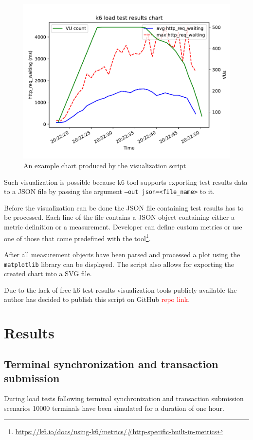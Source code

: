 \documentclass[12pt, a4paper]{article}
\newcommand\todo[1]{\textcolor{red}{#1}}
\let\oldsection\section
\renewcommand\section{\clearpage\oldsection}
\begin{document}
\begin{figure}[!ht]
    \centering 
    \includegraphics[width=1\textwidth]{pdf/visualizer-example.pdf}
    \caption{An example chart produced by the visualization script}
\end{figure}

Such visualization is possible because k6 tool supports exporting test results data to a JSON file by passing the argument \texttt{--out json=<file\_name>} to it.

Before the visualization can be done the JSON file containing test results has to be processed.
Each line of the file contains a JSON object containing either a metric definition or a measurement.
Developer can define custom metrics or use one of those that come predefined with the tool\footnote{\url{https://k6.io/docs/using-k6/metrics/#http-specific-built-in-metrics}}.

After all measurement objects have been parsed and processed a plot using the \texttt{matplotlib} library can be displayed.
The script also allows for exporting the created chart into a SVG file.

Due to the lack of free k6 test results visualization tools publicly available the author has decided to publish this script on GitHub \todo{repo link}.

\section{Results}

\subsection{Terminal synchronization and transaction submission}
During load tests following terminal synchronization and transaction submission scenarios 10000 terminals have been simulated for a duration of one hour.
\end{document}
